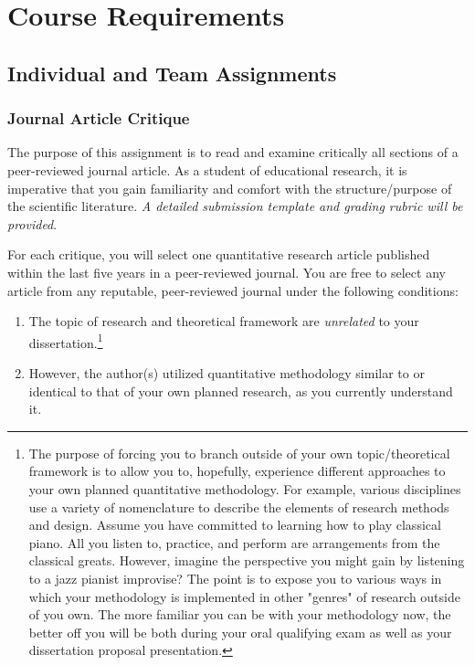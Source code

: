 \documentclass[
]{article}
\providecommand{\tightlist}{%
  \setlength{\itemsep}{0pt}\setlength{\parskip}{0pt}}
\begin{document}
\section{Course Requirements}

\subsection{Individual and Team Assignments}

\subsubsection{Journal Article Critique}

The purpose of this assignment is to read and examine critically all
sections of a peer-reviewed journal article. As a student of educational
research, it is imperative that you gain familiarity and comfort with
the structure/purpose of the scientific literature. \emph{A detailed
submission template and grading rubric will be provided}.

For each critique, you will select one quantitative research article
published within the last five years in a peer-reviewed journal. You are
free to select any article from any reputable, peer-reviewed journal
under the following conditions:

\begin{enumerate}
\def\labelenumi{\arabic{enumi}.}
\tightlist
\item
  The topic of research and theoretical framework are \emph{unrelated}
  to your
  dissertation.\footnote{The purpose of forcing you to branch outside of your own topic/theoretical framework is to allow you to, hopefully, experience different approaches to your own planned quantitative methodology. For example, various disciplines use a variety of nomenclature to describe the elements of research methods and design. Assume you have committed to learning how to play classical piano. All you listen to, practice, and perform are arrangements from the classical greats. However, imagine the perspective you might gain by listening to a jazz pianist improvise? The point is to expose you to various ways in which your methodology is implemented in other "genres" of research outside of you own. The more familiar you can be with your methodology now, the better off you will be both during your oral qualifying exam as well as your dissertation proposal presentation.}
\item
  However, the author(s) utilized quantitative methodology similar to or
  identical to that of your own planned research, as you currently
  understand it.
\end{enumerate}
\end{document}
